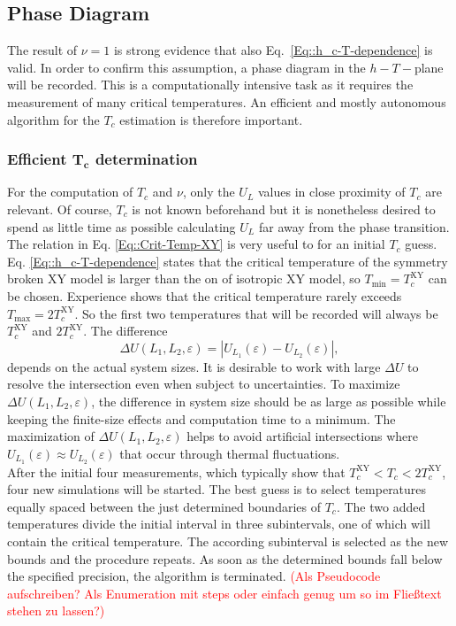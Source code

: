	
	\subsection{Phase Diagram} \label{Section::Phase-Diagram}
	The result of $\nu = 1$ is strong evidence that also Eq.~\eqref{Eq::h_c-T-dependence} is valid. In order to confirm this assumption, a phase diagram in the $h-T-$plane will be recorded. This is a computationally intensive task as it requires the measurement of many critical temperatures. An efficient and mostly autonomous algorithm for the $T_c$ estimation is therefore important.
	
	\subsubsection{Efficient $\boldsymbol{T_c}$ determination} \label{Section::efficient-crit-temp}
	For the computation of $T_c$ and $\nu$, only the $U_L$ values in close proximity of $T_c$ are relevant. Of course, $T_c$ is not known beforehand but it is nonetheless desired to spend as little time as possible calculating $U_L$ far away from the phase transition. The relation in Eq. \eqref{Eq::Crit-Temp-XY} is very useful to for an initial $T_c$ guess. Eq. \eqref{Eq::h_c-T-dependence} states that the critical temperature of the symmetry broken XY model is larger than the on of isotropic XY model, so $T_{\text{min}} = T_c^{\text{XY}}$ can be chosen. Experience shows that the critical temperature rarely exceeds $T_{\text{max}} = 2 T_c^{\text{XY}}$. So the first two temperatures that will be recorded will always be $T_c^{\text{XY}}$ and $2T_c^{\text{XY}}$. The difference
	\begin{equation}
		\Delta U (L_1, L_2, \varepsilon) =	|U_{L_1}(\varepsilon) - U_{L_2}(\varepsilon)|,
	\end{equation}
	depends on the actual system sizes. It is desirable to work with large $\Delta U$ to resolve the intersection even when subject to uncertainties. To maximize $\Delta U(L_1, L_2, \varepsilon)$, the difference in system size should be as large as possible while keeping the finite-size effects and computation time to a minimum. The maximization of $\Delta U (L_1, L_2, \varepsilon)$ helps to avoid artificial intersections where $U_{L_1}(\varepsilon) \approx U_{L_2}(\varepsilon)$ that occur through thermal fluctuations. \\
	
	After the initial four measurements, which typically show that $T_c^{\text{XY}}  < T_c < 2 T_c^{\text{XY}}$, four new simulations will be started. The best guess is to select temperatures equally spaced between the just determined boundaries of $T_c$. The two added temperatures divide the initial interval in three subintervals, one of which will contain the critical temperature. The according subinterval is selected as the new bounds and the procedure repeats. As soon as the determined bounds fall below the specified precision, the algorithm is terminated. \textcolor{red}{(Als Pseudocode aufschreiben? Als Enumeration mit steps oder einfach genug um so im Fließtext stehen zu lassen?)} \\
	
